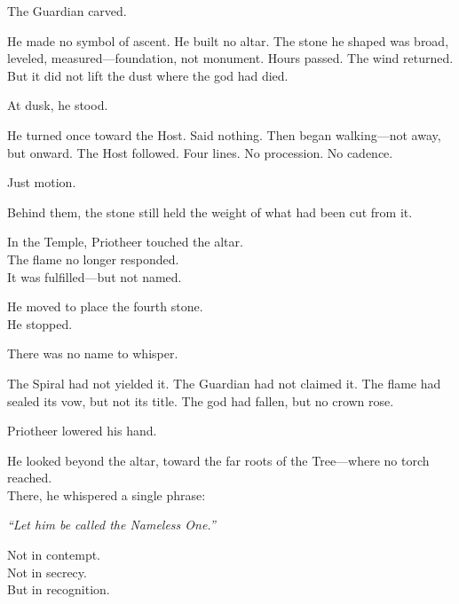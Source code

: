 \documentclass[12pt]{article}
\begin{document}
\vspace{0.5em}
The Guardian carved.

\vspace{0.5em}
He made no symbol of ascent. He built no altar. The stone he shaped was broad, leveled, measured---foundation, not monument. Hours passed. The wind returned. But it did not lift the dust where the god had died.

\vspace{0.5em}
At dusk, he stood.

\vspace{0.5em}
He turned once toward the Host. Said nothing. Then began walking---not away, but onward. The Host followed. Four lines. No procession. No cadence.

\vspace{0.5em}
Just motion.

\vspace{0.5em}
Behind them, the stone still held the weight of what had been cut from it.

\vspace{0.5em}
In the Temple, Priotheer touched the altar.\\
The flame no longer responded.\\
It was fulfilled---but not named.

\vspace{0.5em}
He moved to place the fourth stone.\\
He stopped.

\vspace{0.5em}
There was no name to whisper.

\vspace{0.5em}
The Spiral had not yielded it. The Guardian had not claimed it. The flame had sealed its vow, but not its title. The god had fallen, but no crown rose.

\vspace{0.5em}
Priotheer lowered his hand.

\vspace{0.5em}
He looked beyond the altar, toward the far roots of the Tree---where no torch reached.\\
There, he whispered a single phrase:

\vspace{0.5em}
\textit{``Let him be called the Nameless One.''}

\vspace{0.5em}
Not in contempt.\\
Not in secrecy.\\
But in recognition.
\end{document}
